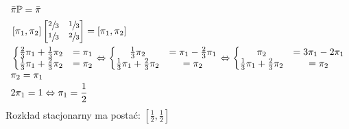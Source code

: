 \documentclass[a4paper,12pt]{article}
\theoremstyle{definition}%
\theoremstyle{definition}
\theoremstyle{problem}
\begin{document}
\begin{align*}
&\bar{\pi}\mathbb{P}=\bar{\pi}\\
&\left[\pi _1, \pi _2\right]\begin{bmatrix}
\sfrac{2}{3}&\sfrac{1}{3}\\
\sfrac{1}{3}&\sfrac{2}{3}
\end{bmatrix} = \left[\pi _1, \pi _2\right]\\
&\left\{\begin{matrix}
\frac{2}{3}\pi _1 + \frac{1}{3}\pi _2 &= \pi _1\\
\frac{1}{3}\pi _1 + \frac{2}{3}\pi _2 &= \pi _2
\end{matrix}\right.\Leftrightarrow \left\{\begin{matrix}
\frac{1}{3}\pi _2 &= \pi _1-\frac{2}{3}\pi _1\\
\frac{1}{3}\pi _1+ \frac{2}{3}\pi _2 &= \pi _2
\end{matrix}\right.\Leftrightarrow \left\{\begin{matrix}
\pi _2 &= 3\pi _1-2\pi _1\\
\frac{1}{3}\pi _1 + \frac{2}{3}\pi _2 &= \pi _2
\end{matrix}\right.\\
&\pi _2 = \pi _1\\
&2\pi _1 = 1 \Leftrightarrow \pi _1 = \frac{1}{2}
\end{align*} 
Rozkład stacjonarny ma postać: $\left[\frac{1}{2}, \frac{1}{2}\right]$
\end{document}
